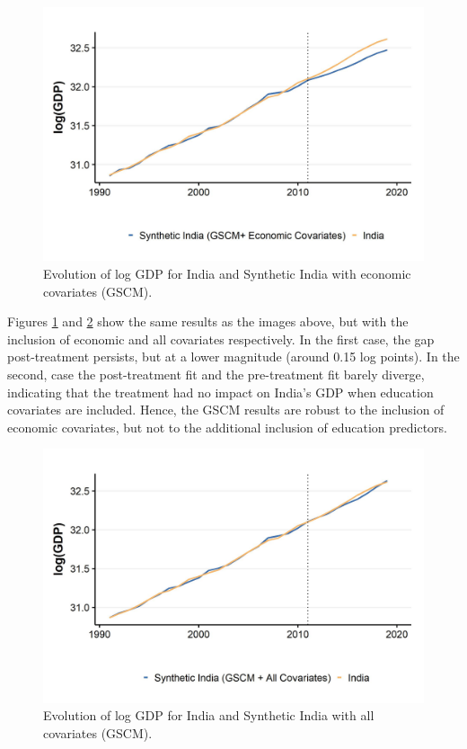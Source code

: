 \documentclass[12pt,nobind, a4paper]{reedthesis}
\begin{document}
 \begin{figure}

 {\centering \includegraphics[width=1\linewidth]{figure/indiagsynthc2} 

 }

 \caption{Evolution of log GDP for India and Synthetic India with economic covariates (GSCM).}\label{fig:indgsync1}
 \end{figure}
 Figures \ref{fig:indgsync1} and \ref{fig:indgsync2} show the same results as the images above, but with the inclusion of economic and all covariates respectively. In the first case, the gap post-treatment persists, but at a lower magnitude (around 0.15 log points). In the second, case the post-treatment fit and the pre-treatment fit barely diverge, indicating that the treatment had no impact on India's GDP when education covariates are included. Hence, the GSCM results are robust to the inclusion of economic covariates, but not to the additional inclusion of education predictors.
 \newpage
 \begin{figure}

 {\centering \includegraphics[width=1\linewidth]{figure/indiagsynthc1} 

 }

 \caption{Evolution of log GDP for India and Synthetic India with all covariates (GSCM).}\label{fig:indgsync2}
 \end{figure}
\end{document}
